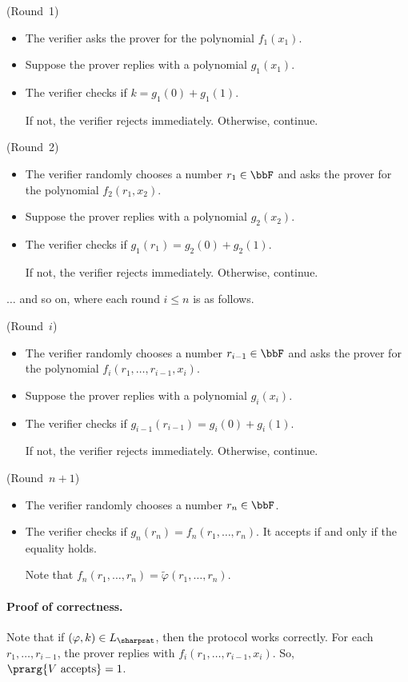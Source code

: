 \documentclass[11pt, a4paper]{article}
\begin{document}
\vspace{0.3cm}
\noindent
(Round~1)
\begin{itemize}
\item
The verifier asks the prover for the polynomial $f_1(x_1)$.
\item 
Suppose the prover replies with a polynomial $g_1(x_1)$.
\item 
The verifier checks if $k=g_1(0)+g_1(1)$.

If not, the verifier rejects immediately. Otherwise, continue.
\end{itemize}

\noindent
(Round~2)
\begin{itemize}
\item
The verifier randomly chooses a number $r_1\in \bbF$
and asks the prover for the polynomial $f_2(r_1,x_2)$.
\item 
Suppose the prover replies with a polynomial $g_2(x_2)$.
\item 
The verifier checks if $g_1(r_1)= g_2(0)+g_2(1)$.

If not, the verifier rejects immediately. Otherwise, continue.
\end{itemize}
$\ldots$ and so on, where each round $i\leq n$ is as follows.

\vspace{0.3cm}
\noindent
(Round~$i$)
\begin{itemize}
\item
The verifier randomly chooses a number $r_{i-1}\in \bbF$
and asks the prover for the polynomial $f_i(r_1,\ldots,r_{i-1},x_i)$.
\item 
Suppose the prover replies with a polynomial $g_i(x_i)$.
\item 
The verifier checks if $g_{i-1}(r_{i-1})= g_i(0)+g_i(1)$.

If not, the verifier rejects immediately. Otherwise, continue.
\end{itemize}


\noindent
(Round~$n+1$)
\begin{itemize}
\item
The verifier randomly chooses a number $r_{n}\in \bbF$.
\item 
The verifier checks if $g_{n}(r_{n})= f_n(r_1,\ldots,r_n)$.
It accepts if and only if the equality holds.

Note that $f_n(r_1,\ldots,r_n)=\widetilde{\varphi}(r_1,\ldots,r_n)$.
\end{itemize}


\paragraph*{Proof of correctness.}
Note that if $(\varphi,k)\in L_{\sharpsat}$, then the protocol works correctly.
For each $r_1,\ldots,r_{i-1}$, the prover replies with $f_i(r_1,\ldots,r_{i-1},x_i)$.
So, $\prarg {V \ \text{accepts}}=1$.
\end{document}
